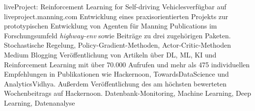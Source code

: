 
\begin{projects}
    \project
	{liveProject: Reinforcement Learning for Self-driving Vehicles}{verfügbar auf liveproject.manning.com}
	{}
	{Entwicklung eines praxisorientierten Projekts zur prototypischen Entwicklung von Agenten für Manning Publications im Forschungsumfeld \textit{highway-env} sowie Beiträge zu drei zugehörigen Paketen.}
	{Stochastische Regelung, Policy-Gradient-Methoden, Actor-Critic-Methoden}
	\project
	{Medium Blogging}{}
	{
	}
	{Veröffentlichung von Artikeln über DL, ML, KI und Reinforcement Learning mit über 70.000 Aufrufen und mehr als 475 individuellen Empfehlungen in Publikationen wie Hackernoon, TowardsDataScience und AnalyticsVidhya. Außerdem Veröffentlichung des am höchsten bewerteten Wochenbeitrags auf Hackernoon.}
	{Datenbank-Monitoring, Machine Learning, Deep Learning, Datenanalyse}

\end{projects}
